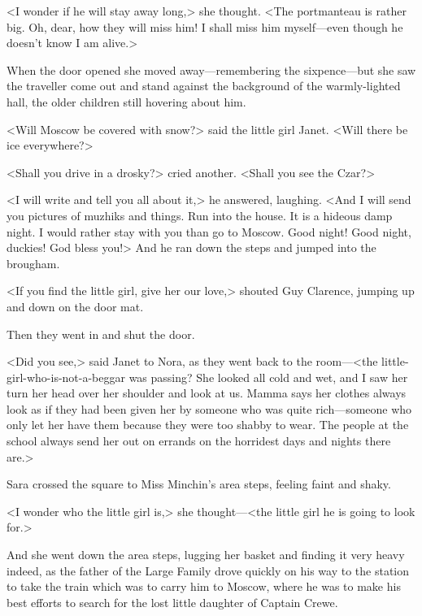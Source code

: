 <I wonder if he will stay away long,> she thought. <The portmanteau is rather big. Oh, dear, how they will miss him! I shall miss him myself—even though he doesn't know I am alive.>

When the door opened she moved away—remembering the sixpence—but she saw the traveller come out and stand against the background of the warmly-lighted hall, the older children still hovering about him.

<Will Moscow be covered with snow?> said the little girl Janet. <Will there be ice everywhere?>

<Shall you drive in a drosky?> cried another. <Shall you see the Czar?>

<I will write and tell you all about it,> he answered, laughing. <And I will send you pictures of muzhiks and things. Run into the house. It is a hideous damp night. I would rather stay with you than go to Moscow. Good night! Good night, duckies! God bless you!> And he ran down the steps and jumped into the brougham.

<If you find the little girl, give her our love,> shouted Guy Clarence, jumping up and down on the door mat.

Then they went in and shut the door.

<Did you see,> said Janet to Nora, as they went back to the room—<the little-girl-who-is-not-a-beggar was passing? She looked all cold and wet, and I saw her turn her head over her shoulder and look at us. Mamma says her clothes always look as if they had been given her by someone who was quite rich—someone who only let her have them because they were too shabby to wear. The people at the school always send her out on errands on the horridest days and nights there are.>

Sara crossed the square to Miss Minchin's area steps, feeling faint and shaky.

<I wonder who the little girl is,> she thought—<the little girl he is going to look for.>

And she went down the area steps, lugging her basket and finding it very heavy indeed, as the father of the Large Family drove quickly on his way to the station to take the train which was to carry him to Moscow, where he was to make his best efforts to search for the lost little daughter of Captain Crewe.